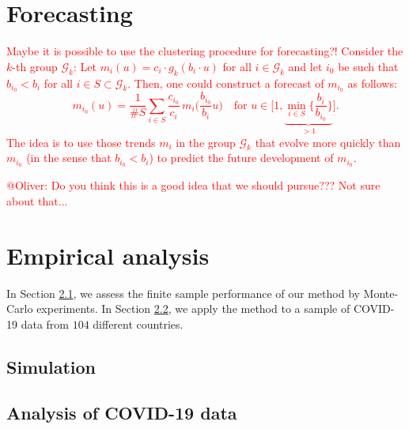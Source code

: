 \documentclass[a4paper,12pt]{article}
\numberwithin{equation}{section}
\begin{document}
\section{Forecasting} 


\textcolor{red}{Maybe it is possible to use the clustering procedure for forecasting?! Consider the $k$-th group $\mathcal{G}_k$: Let $m_i(u) = c_i \cdot g_k(b_i \cdot u)$ for all $i \in \mathcal{G}_k$ and let $i_0$ be such that $b_{i_0} < b_i$ for all $i \in S \subset \mathcal{G}_k$. Then, one could construct a forecast of $m_{i_0}$ as follows: 
\[ m_{i_0}(u) = \frac{1}{\# S} \sum_{i \in S} \frac{c_{i_0}}{c_i} \,  m_i\Big( \frac{b_{i_0}}{b_i} u \Big) \quad \text{for } u \in \Big[1,\underbrace{\min_{i \in S} \Big\{ \frac{b_i}{b_{i_0}} \Big\}}_{>1} \Big]. \]
The idea is to use those trends $m_i$ in the group $\mathcal{G}_k$ that evolve more quickly than $m_{i_0}$ (in the sense that $b_{i_0} < b_i$) to predict the future development of $m_{i_0}$.
}
\vspace{10pt}


\noindent \textcolor{red}{@Oliver: Do you think this is a good idea that we should pursue??? Not sure about that...} 



\section{Empirical analysis}\label{sec:app}


In Section \ref{subsec:sim}, we assess the finite sample performance of our method by Monte-Carlo experiments. In Section \ref{subsec:app}, we apply the method to a sample of COVID-19 data from $104$ different countries.


\subsection{Simulation}\label{subsec:sim}


\subsection{Analysis of COVID-19 data}\label{subsec:app}


\end{document}
